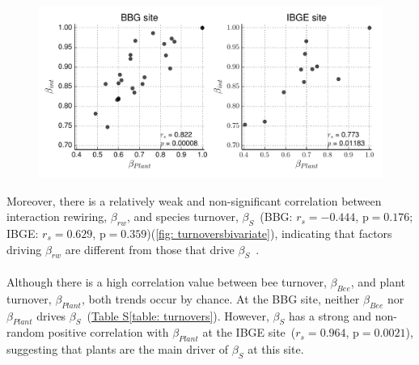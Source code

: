 \documentclass[11pt]{article}
\begin{document}
\vspace*{\fill}
\begin{figure}[H]
  \centering
    \includegraphics[width=\textwidth]{plantturnover.pdf}
       \label{fig: plantturnover}
\end{figure} 
\vspace*{\fill}
Moreover, there is a relatively weak and non-significant correlation between interaction rewiring, $\beta_{rw}$, and species turnover, $\beta_{S}$~(BBG: $r_{s}=-0.444$, $\text{p}=0.176$; IBGE: $r_{s}=0.629$, $\text{p}=0.359$)(\autoref{fig: turnoversbivariate}), indicating that factors driving $\beta_{rw}$ are different from those that drive $\beta_{S}$~\citep{Poisot2012}. \\
\\
Although there is a high correlation value between bee turnover, $\beta_{Bee}$, and plant turnover, $\beta_{Plant}$, both trends occur by chance. At the BBG site, neither $\beta_{Bee}$ nor $\beta_{Plant}$ drives $\beta_{S}$~(\hyperref[table: turnovers]{Table S\ref{table: turnovers}}). However, $\beta_{S}$ has a strong and non-random positive correlation with $\beta_{Plant}$ at the IBGE site~($r_{s}=0.964$, $\text{p}=0.0021$), suggesting that plants are the main driver of $\beta_{S}$ at this site. 
\vspace*{\fill}
\end{document}
